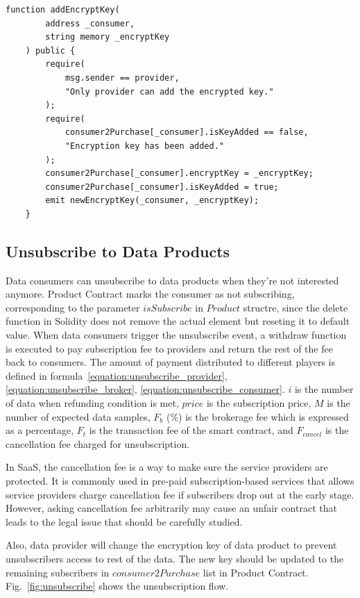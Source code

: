 \documentclass[conference]{IEEEtran}
\begin{document}
\lstset{style=solidity}

\begin{lstlisting}[caption={Add encryption key to data consumers}, label={lst:key_exchange}, frame=single]
    function addEncryptKey(
        address _consumer,
        string memory _encryptKey
    ) public {
        require(
            msg.sender == provider,
            "Only provider can add the encrypted key."
        );
        require(
            consumer2Purchase[_consumer].isKeyAdded == false,
            "Encryption key has been added."
        );
        consumer2Purchase[_consumer].encryptKey = _encryptKey;
        consumer2Purchase[_consumer].isKeyAdded = true;
        emit newEncryptKey(_consumer, _encryptKey);
    }
\end{lstlisting}

\subsection{Unsubscribe to Data Products}
Data consumers can unsubscribe to data products when they're not interested anymore. Product Contract marks the consumer as not subscribing, corresponding to the parameter $isSubscribe$ in $Product$ structre, since the delete function in Solidity does not remove the actual element but reseting it to default value. When data consumers trigger the unsubscribe event, a withdraw function is executed to pay subscription fee to providers and return the rest of the fee back to consumers. The amount of payment distributed to different players is defined in formula~\ref{equation:unsubscribe_provider}, \ref{equation:unsubscribe_broker}, \ref{equation:unsubscribe_consumer}. $i$ is the number of data when refunding condition is met, $price$  is the subscription price, $M$ is the number of expected data samples, $F_{b}$ (\%) is the brokerage fee which is expressed as a percentage, $F_{t}$ is the transaction fee of the smart contract, and $F_{cancel}$ is the cancellation fee charged for unsubscription. 

In SaaS, the cancellation fee is a way to make sure the service providers are protected. It is commonly used in pre-paid subscription-based services that allows service providers charge cancellation fee if subscribers drop out at the early stage. However, asking cancellation fee arbitrarily may cause an unfair contract that leads to the legal issue that should be carefully studied.

Also, data provider will change the encryption key of data product to prevent unsubscribers access to rest of the data. The new key should be updated to the remaining subscribers in $consumer2Purchase$ list in Product Contract. Fig.~\ref{fig:unsubscribe} shows the unsubscription flow.
\end{document}
